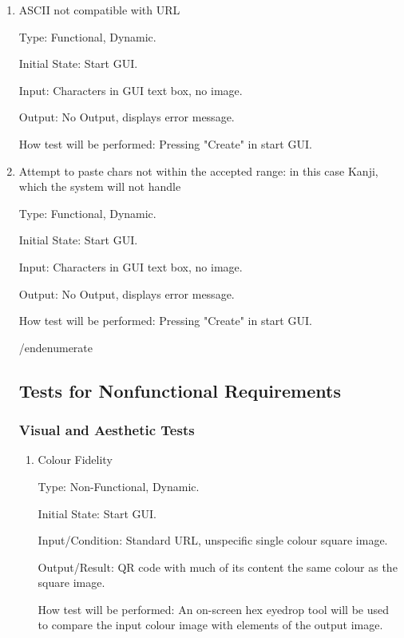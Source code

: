 \documentclass[12pt, titlepage]{article}
\begin{document}
\begin{enumerate}

\item{ASCII not compatible with URL\\}

Type: Functional, Dynamic.
					
Initial State: Start GUI.
					
Input: Characters in GUI text box, no image.
					
Output: No Output, displays error message.
					
How test will be performed: Pressing "Create" in start GUI.

\item{Attempt to paste chars not within the accepted range: in this case Kanji, which the system will not handle\\}

Type: Functional, Dynamic.
					
Initial State: Start GUI.
					
Input: Characters in GUI text box, no image.
					
Output: No Output, displays error message.
					
How test will be performed: Pressing "Create" in start GUI.

/end{enumerate}

\subsection{Tests for Nonfunctional Requirements}

\subsubsection{Visual and Aesthetic Tests}

\begin{enumerate}

\item{Colour Fidelity\\}

Type: Non-Functional, Dynamic.
					
Initial State: Start GUI.
					
Input/Condition: Standard URL, unspecific single colour square image.
					
Output/Result: QR code with much of its content the same colour as the square image.
					
How test will be performed: An on-screen hex eyedrop tool will be used to compare the input colour image with elements of the output image.
					

\end{enumerate}
\end{enumerate}
\end{document}
